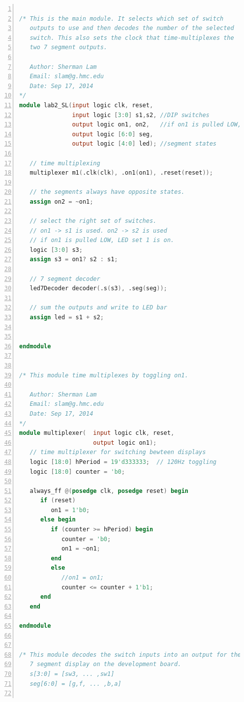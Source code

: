 \documentclass[11pt]{article}
\begin{document}
\begin{lstlisting}[language=Verilog,numbers=left,basicstyle=\footnotesize]

/* This is the main module. It selects which set of switch
   outputs to use and then decodes the number of the selected
   switch. This also sets the clock that time-multiplexes the 
   two 7 segment outputs.
   
   Author: Sherman Lam
   Email: slam@g.hmc.edu
   Date: Sep 17, 2014
*/
module lab2_SL(input logic clk, reset,
               input logic [3:0] s1,s2, //DIP switches
               output logic on1, on2,   //if on1 is pulled LOW, LED set 1 is on.
               output logic [6:0] seg,
               output logic [4:0] led); //segment states    
   
   // time multiplexing
   multiplexer m1(.clk(clk), .on1(on1), .reset(reset));
   
   // the segments always have opposite states.
   assign on2 = ~on1;      
   
   // select the right set of switches.
   // on1 -> s1 is used. on2 -> s2 is used
   // if on1 is pulled LOW, LED set 1 is on.
   logic [3:0] s3;
   assign s3 = on1? s2 : s1;  
   
   // 7 segment decoder
   led7Decoder decoder(.s(s3), .seg(seg));
   
   // sum the outputs and write to LED bar
   assign led = s1 + s2;
   
   
endmodule


/* This module time multiplexes by toggling on1.

   Author: Sherman Lam
   Email: slam@g.hmc.edu
   Date: Sep 17, 2014
*/
module multiplexer(  input logic clk, reset,
                     output logic on1);
   // time multiplexer for switching bewteen displays
   logic [18:0] hPeriod = 19'd333333;  // 120Hz toggling
   logic [18:0] counter = 'b0;
      
   always_ff @(posedge clk, posedge reset) begin
      if (reset)     
         on1 = 1'b0;
      else begin
         if (counter >= hPeriod) begin
            counter = 'b0;
            on1 = ~on1;
         end
         else
            //on1 = on1;
            counter <= counter + 1'b1;
      end
   end
   
endmodule


/* This module decodes the switch inputs into an output for the 
   7 segment display on the development board.
   s[3:0] = [sw3, ... ,sw1]
   seg[6:0] = [g,f, ... ,b,a]
   

\end{lstlisting}
\end{document}
